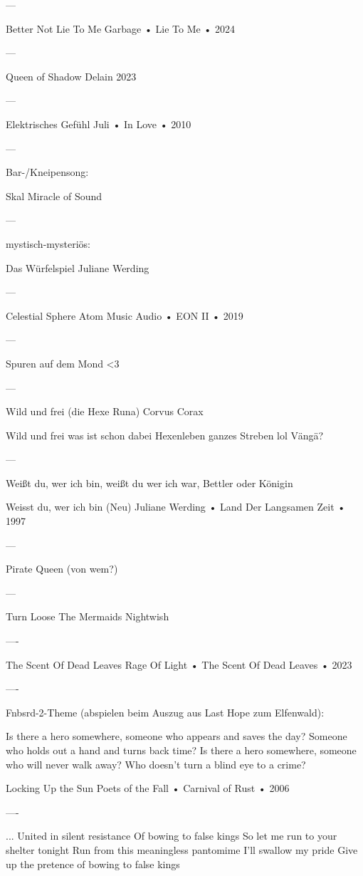 —

Better Not Lie To Me
Garbage
 •
Lie To Me
 •
2024

—

Queen of Shadow
Delain
2023

—

Elektrisches Gefühl
Juli
 •
In Love
 •
2010

—

Bar-/Kneipensong:

Skal
Miracle of Sound

—

mystisch-mysteriös:

Das Würfelspiel
Juliane Werding

—

Celestial Sphere
Atom Music Audio
 •
EON II
 • 2019

—

Spuren auf dem Mond <3

—

Wild und frei (die Hexe Runa)
Corvus Corax

Wild und frei
was ist schon dabei
Hexenleben ganzes Streben
lol
Vängä?

—

Weißt du, wer ich bin, weißt du wer ich war, Bettler oder Königin

Weisst du, wer ich bin (Neu)
Juliane Werding
 •
Land Der Langsamen Zeit
 • 1997

—

Pirate Queen
(von wem?)

—

Turn Loose The Mermaids
Nightwish

----

The Scent Of Dead Leaves
Rage Of Light
•
The Scent Of Dead Leaves
• 2023

----

Fnbsrd-2-Theme (abspielen beim Auszug aus Last Hope zum Elfenwald):

Is there a hero somewhere, someone who appears and saves the day?
Someone who holds out a hand and turns back time?
Is there a hero somewhere, someone who will never walk away?
Who doesn't turn a blind eye to a crime?

Locking Up the Sun
Poets of the Fall
 •
Carnival of Rust
 •
2006

----

...
United in silent resistance
Of bowing to false kings
So let me run to your shelter tonight
Run from this meaningless pantomime
I'll swallow my pride
Give up the pretence of bowing to false kings


